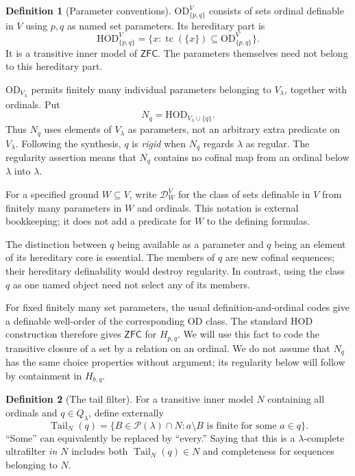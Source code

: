 \documentclass[11pt,letterpaper]{article}
\theoremstyle{definition}
\newtheorem{definition}{Definition}[section]
\numberwithin{equation}{section}
\newcommand{\ZFC}{\mathsf{ZFC}}
\newcommand{\HOD}{\mathrm{HOD}}
\newcommand{\OD}{\mathrm{OD}}
\newcommand{\Pow}{\mathcal P}
\newcommand{\tc}{\operatorname{tc}}
\newcommand{\tail}{\operatorname{Tail}}
\newcommand{\Dg}{\mathcal D_W^V}
\begin{document}
\begin{definition}[Parameter conventions]\label{def:parameters}
$\OD_{\{p,q\}}^V$ consists of sets ordinal definable in $V$ using $p,q$ as named set parameters. Its hereditary part is
\[
\HOD_{\{p,q\}}^V=\{x:\tc(\{x\})\subseteq\OD_{\{p,q\}}^V\}.
\]
It is a transitive inner model of $\ZFC$. The parameters themselves need not belong to this hereditary part.

$\OD_{V_\lambda}$ permits finitely many individual parameters belonging to $V_\lambda$, together with ordinals. Put
\[
N_q=\HOD_{V_\lambda\cup\{q\}}.
\]
Thus $N_q$ uses elements of $V_\lambda$ as parameters, not an arbitrary extra predicate on $V_\lambda$. Following the synthesis, $q$ is \emph{rigid} when $N_q$ regards $\lambda$ as regular. The regularity assertion means that $N_q$ contains no cofinal map from an ordinal below $\lambda$ into $\lambda$.

For a specified ground $W\subseteq V$, write $\Dg$ for the class of sets definable in $V$ from finitely many parameters in $W$ and ordinals. This notation is external bookkeeping; it does not add a predicate for $W$ to the defining formulas.
\end{definition}

The distinction between $q$ being available as a parameter and $q$ being an element of its hereditary core is essential. The members of $q$ are new cofinal sequences; their hereditary definability would destroy regularity. In contrast, using the class $q$ as one named object need not select any of its members.

For fixed finitely many set parameters, the usual definition-and-ordinal codes give a definable well-order of the corresponding $\OD$ class. The standard HOD construction therefore gives $\ZFC$ for $H_{p,q}$. We will use this fact to code the transitive closure of a set by a relation on an ordinal. We do not assume that $N_q$ has the same choice properties without argument; its regularity below will follow by containment in $H_{b,q}$.

\begin{definition}[The tail filter]
For a transitive inner model $N$ containing all ordinals and $q\in Q_\lambda$, define externally
\begin{equation}\label{eq:tailfilter}
\tail_N(q)=\{B\in\Pow(\lambda)\cap N:
                  a\setminus B\text{ is finite for some }a\in q\}.
\end{equation}
``Some'' can equivalently be replaced by ``every.'' Saying that this is a $\lambda$-complete ultrafilter \emph{in $N$} includes both $\tail_N(q)\in N$ and completeness for sequences belonging to $N$.
\end{definition}
\end{document}
